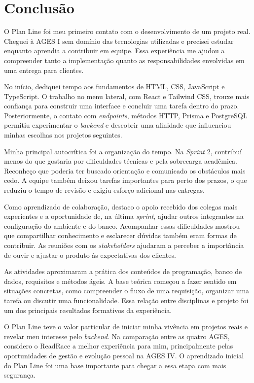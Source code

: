 \section{Conclusão}

O Plan Line foi meu primeiro contato com o desenvolvimento de um projeto real. Cheguei à \ac{AGES} I sem domínio das tecnologias utilizadas e precisei estudar enquanto aprendia a contribuir em equipe. Essa experiência me ajudou a compreender tanto a implementação quanto as responsabilidades envolvidas em uma entrega para clientes.

No início, dediquei tempo aos fundamentos de \ac{HTML}, \ac{CSS}, JavaScript e TypeScript. O trabalho no menu lateral, com React e Tailwind \ac{CSS}, trouxe mais confiança para construir uma interface e concluir uma tarefa dentro do prazo. Posteriormente, o contato com \textit{endpoints}, métodos \ac{HTTP}, Prisma e PostgreSQL permitiu experimentar o \textit{backend} e descobrir uma afinidade que influenciou minhas escolhas nos projetos seguintes.

Minha principal autocrítica foi a organização do tempo. Na \textit{Sprint} 2, contribuí menos do que gostaria por dificuldades técnicas e pela sobrecarga acadêmica. Reconheço que poderia ter buscado orientação e comunicado os obstáculos mais cedo. A equipe também deixou tarefas importantes para perto dos prazos, o que reduziu o tempo de revisão e exigiu esforço adicional nas entregas.

Como aprendizado de colaboração, destaco o apoio recebido dos colegas mais experientes e a oportunidade de, na última \textit{sprint}, ajudar outros integrantes na configuração do ambiente e do banco. Acompanhar essas dificuldades mostrou que compartilhar conhecimento e esclarecer dúvidas também eram formas de contribuir. As reuniões com os \textit{stakeholders} ajudaram a perceber a importância de ouvir e ajustar o produto às expectativas dos clientes.

As atividades aproximaram a prática dos conteúdos de programação, banco de dados, requisitos e métodos ágeis. A base teórica começou a fazer sentido em situações concretas, como compreender o fluxo de uma requisição, organizar uma tarefa ou discutir uma funcionalidade. Essa relação entre disciplinas e projeto foi um dos principais resultados formativos da experiência.

O Plan Line teve o valor particular de iniciar minha vivência em projetos reais e revelar meu interesse pelo \textit{backend}. Na comparação entre as quatro \ac{AGES}, considero o ReadRace a melhor experiência para mim, principalmente pelas oportunidades de gestão e evolução pessoal na \ac{AGES} IV. O aprendizado inicial do Plan Line foi uma base importante para chegar a essa etapa com mais segurança.
